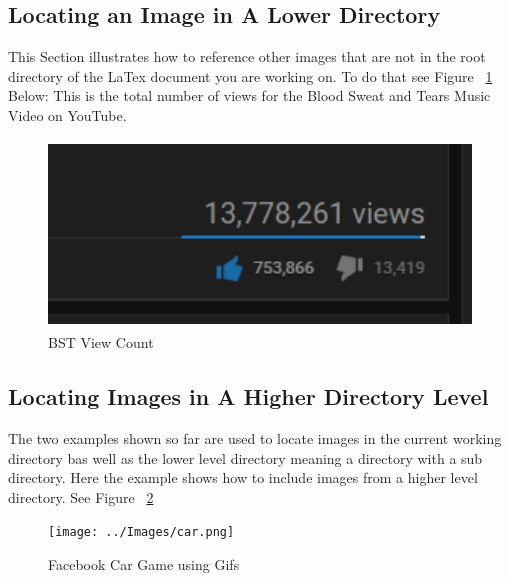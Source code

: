 \documentclass{article}
\begin{document}
	\subsection{Locating an Image in A Lower Directory}
	This Section illustrates how to reference other images that are not in the root directory of the LaTex document you are working on.
	To do that see Figure ~\ref{bts_views} Below:
	This is the total number of views for the Blood Sweat and Tears Music Video on YouTube.
	
	\begin{figure}[htbp]
		\begin{center}
			
			\includegraphics[height=5cm]{img/bts.png}
			\caption{ BST View Count}
			\label{bts_views}
			
		\end{center}
	\end{figure}

	\subsection{Locating Images in A Higher Directory Level}
	The two examples shown so far are used to locate images in the current working directory bas well as the lower level directory meaning a directory with a sub directory. Here the example shows how to include images from a higher level directory. See Figure ~\ref{car_image}
	
		\begin{figure}[htbp]
		\begin{center}
			
			\texttt{[image: ../Images/car.png]}
			\caption{ Facebook Car Game using Gifs}
			\label{car_image}
			
		\end{center}
	\end{figure}
	
	

	

	
\end{document}
